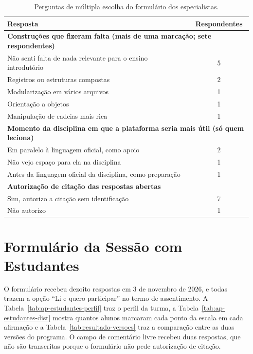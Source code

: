 \begin{table}[htbp]
\centering
\caption{Perguntas de múltipla escolha do formulário dos especialistas.}
\label{tab:ap-multipla}
\footnotesize
\renewcommand{\arraystretch}{1.2}
\begin{tabular}{|p{10.5cm}|c|}
\hline
\textbf{Resposta} & \textbf{Respondentes} \\\hline
\multicolumn{2}{|l|}{\textbf{Construções que fizeram falta (mais de uma marcação; sete respondentes)}} \\\hline
Não senti falta de nada relevante para o ensino introdutório & 5 \\\hline
Registros ou estruturas compostas & 2 \\\hline
Modularização em vários arquivos & 1 \\\hline
Orientação a objetos & 1 \\\hline
Manipulação de cadeias mais rica & 1 \\\hline
\multicolumn{2}{|l|}{\textbf{Momento da disciplina em que a plataforma seria mais útil (só quem leciona)}} \\\hline
Em paralelo à linguagem oficial, como apoio & 2 \\\hline
Não vejo espaço para ela na disciplina & 1 \\\hline
Antes da linguagem oficial da disciplina, como preparação & 1 \\\hline
\multicolumn{2}{|l|}{\textbf{Autorização de citação das respostas abertas}} \\\hline
Sim, autorizo a citação sem identificação & 7 \\\hline
Não autorizo & 1 \\\hline
\end{tabular}
\end{table}

\section{Formulário da Sessão com Estudantes}

O formulário recebeu dezoito respostas em 3 de novembro de 2026, e todas trazem a opção ``Li e quero participar'' no termo de assentimento. A Tabela~\ref{tab:ap-estudantes-perfil} traz o perfil da turma, a Tabela~\ref{tab:ap-estudantes-dist} mostra quantos alunos marcaram cada ponto da escala em cada afirmação e a Tabela~\ref{tab:resultado-versoes} traz a comparação entre as duas versões do programa. O campo de comentário livre recebeu duas respostas, que não são transcritas porque o formulário não pede autorização de citação.

